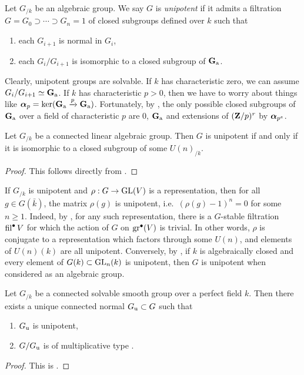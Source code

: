 \begin{definition}
Let $G_{/k}$ be an algebraic group. We say $G$ is \emph{unipotent} if it admits 
a filtration $G=G_0\supset \cdots \supset G_n=1$ of closed subgroups defined 
over $k$ such that 
\begin{enumerate}
  \item each $G_{i+1}$ is normal in $G_i$, 
  \item each $G_i/G_{i+1}$ is isomorphic to a closed subgroup of $\mathbf{G}_\mathrm{a}$. 
\end{enumerate}
\end{definition}

Clearly, unipotent groups are solvable. If $k$ has characteristic zero, we can 
assume $G_i/G_{i+1}\simeq \mathbf{G}_\mathrm{a}$. If $k$ has characteristic $p>0$, then we have 
to worry about things like $\bm{\alpha}_p=\ker(\mathbf{G}_\mathrm{a}\xrightarrow p \mathbf{G}_\mathrm{a})$. 
Fortunately, by \cite[XVII 1.5]{sga3-ii}, the only possible closed subgroups of 
$\mathbf{G}_\mathrm{a}$ over a field of characteristic $p$ are $0$, $\mathbf{G}_\mathrm{a}$ and extensions of 
$(\mathbf{Z}/p)^r$ by $\bm{\alpha}_{p^e}$. 

\begin{theorem}
Let $G_{/k}$ be a connected linear algebraic group. Then $G$ is unipotent 
if and only if it is isomorphic to a closed subgroup of some $U(n)_{/k}$. 
\end{theorem}
\begin{proof}
This follows directly from \cite[XVII 3.5]{sga3-ii}. 
\end{proof}

If $G_{/k}$ is unipotent and $\rho:G\to \operatorname{GL}(V)$ is a representation, then for 
all $g\in G(\bar k)$, the matrix $\rho(g)$ is unipotent, i.e.~$(\rho(g)-1)^n=0$ 
for some $n\geqslant 1$. Indeed, by \cite[XVII 3.4]{sga3-ii}, for any such 
representation, there is a 
$G$-stable filtration $\operatorname{fil}^\bullet V$ for which the action of $G$ 
on $\operatorname{gr}^\bullet(V)$ is trivial. In other words, $\rho$ is conjugate to 
a representation which factors through some $U(n)$, and elements of 
$U(n)(k)$ are all unipotent. Conversely, by \cite[XVII 3.8]{sga3-ii}, if 
$k$ is algebraically closed and every element of $G(k)\subset \operatorname{GL}_n(k)$ is 
unipotent, then $G$ is unipotent when considered as an algebraic group. 

\begin{theorem}
Let $G_{/k}$ be a connected solvable smooth group over a perfect field $k$. 
Then there exists a unique connected normal $G_{\mathrm{u}}\subset G$ such that 
\begin{enumerate}
  \item $G_{\mathrm{u}}$ is unipotent, 
  \item $G/G_{\mathrm{u}}$ is of multiplicative type .
\end{enumerate}
\end{theorem}
\begin{proof}
This is \cite[XVII 17.23]{milne-iAG}. 
\end{proof}

